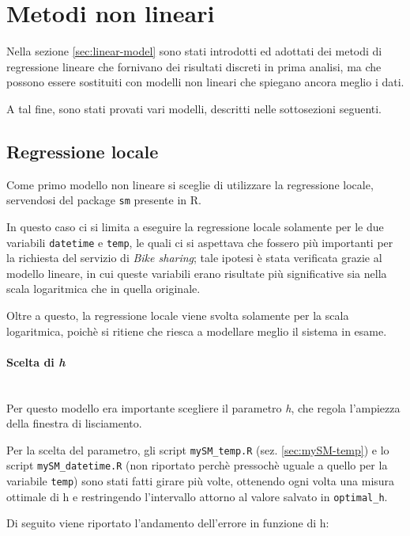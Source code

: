\section{Metodi non lineari}\label{sec:non-linear}

Nella sezione \ref{sec:linear-model} sono stati introdotti ed adottati dei
metodi di regressione lineare che fornivano dei risultati discreti in prima
analisi, ma che possono essere sostituiti con modelli non lineari che spiegano
ancora meglio i dati.

A tal fine, sono stati provati vari modelli, descritti nelle sottosezioni
seguenti.

\subsection{Regressione locale}\label{sec:local-regression}
Come primo modello non lineare si sceglie di utilizzare la regressione locale,
servendosi del package \texttt{sm} presente in R.

In questo caso ci si limita a eseguire la regressione locale solamente per le
due variabili \texttt{datetime} e \texttt{temp}, le quali ci si aspettava che
fossero più importanti per la richiesta del servizio di \emph{Bike sharing};
tale ipotesi è stata verificata grazie al modello lineare, in cui queste
variabili erano risultate più significative sia nella scala logaritmica che in
quella originale.

Oltre a questo, la regressione locale viene svolta solamente per la scala
logaritmica, poichè si ritiene che riesca a modellare meglio il sistema in
esame.

\paragraph{Scelta di \emph{h}} \mbox{}\\
Per questo modello era importante scegliere il parametro \emph{h}, che regola
l'ampiezza della finestra di lisciamento.

Per la scelta del parametro, gli script \texttt{mySM\_temp.R} (sez.
\ref{sec:mySM-temp}) e lo script \texttt{mySM\_datetime.R} (non riportato
perchè pressochè uguale a quello per la variabile \texttt{temp}) sono stati
fatti girare più volte, ottenendo ogni volta una misura ottimale di h e
restringendo l'intervallo attorno al valore salvato in \texttt{optimal\_h}.

Di seguito viene riportato l'andamento dell'errore in funzione di h:

